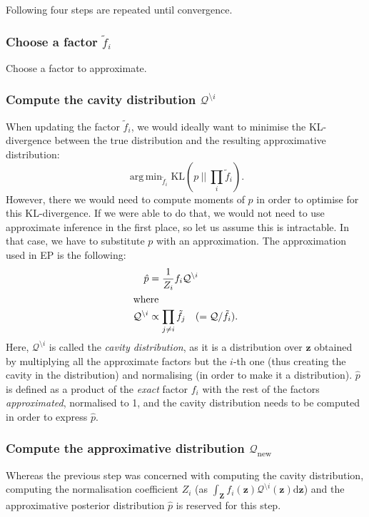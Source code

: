 \documentclass[11pt]{article}
\newcommand{\term}[1]{\textit{#1}}
\newcommand{\vek}[1]{\ensuremath{\mathbf{#1}}}
\newcommand{\kve}{\ensuremath{\mathcal{Q}}}
\newcommand{\byd}{\ensuremath{\mathrm{d}}}
\newcommand{\KL}[2]{\ensuremath{\text{KL}(#1\:||\:#2)}}
\DeclareMathOperator*{\argmin}{arg\,min}
\begin{document}
Following four steps are repeated until convergence.

\subsubsection[Choose a factor]{Choose a factor $\tilde{f}_i$}
Choose a factor to approximate.

\subsubsection[Compute the cavity distribution]{Compute the cavity 
	distribution $\kve^{\setminus i}$}
When updating the factor $\tilde{f}_i$, we would ideally want to minimise 
the KL-divergence between the true distribution and the resulting 
approximative distribution:
\begin{equation}
	\argmin_{\tilde{f}_i}\KL{p}{\prod_i{\tilde{f}_i}}.
\end{equation}
However, there we would need to compute moments of $p$ in order to optimise 
for this KL-divergence. If we were able to do that, we would not need to 
use approximate inference in the first place, so let us assume this is 
intractable. In that case, we have to substitute $p$ with an approximation.  
The approximation used in EP is the following:
\begin{align}
	\hat{p} &= \frac{1}{Z_i}f_i\kve^{\setminus i} \label{eq:phat}\\
\intertext{where}
	\kve^{\setminus i} &\propto \prod_{j \not= i}\tilde{f}_j
		\hspace{1em}(= \kve / \tilde{f}_i).
	\label{eq:cavity}
\end{align}
Here, $\kve^{\setminus i}$ is called the \term{cavity distribution}, as it
is a distribution over $\vek{z}$ obtained by multiplying all the 
approximate factors but the $i$-th one (thus creating the cavity in the 
distribution) and normalising (in order to make it a distribution).  
$\hat{p}$ is defined as a product of the \emph{exact} factor $f_i$ with the 
rest of the factors \emph{approximated}, normalised to 1, and the cavity 
distribution needs to be computed in order to express $\hat{p}$.

\subsubsection[Compute the approximative distribution]{Compute the 
	approximative distribution $\kve_{\text{new}}$}
Whereas the previous step was concerned with computing the cavity 
distribution, computing the normalisation coefficient $Z_i$ (as 
$\int_{\vek{Z}} f_i(\vek{z})\kve^{\setminus i}(\vek{z})\byd\vek{z}$) and 
the approximative posterior distribution $\hat{p}$ is reserved for this 
step.
\end{document}

